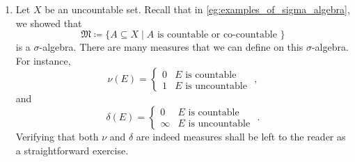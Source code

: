 \documentclass[notoc,notitlepage]{tufte-book}
\begin{document}
\begin{eg}
\begin{enumerate}
    \item Let $X$ be an uncountable set.
      Recall that in \cref{eg:examples_of_sigma_algebra},
      we showed that
      \begin{equation*}
        \mathfrak{M} \coloneqq \{ A \subseteq X
          \mid A \text{ is countable or co-countable } \}
      \end{equation*}
      is a $\sigma$-algebra.
      There are many measures that we can define on this $\sigma$-algebra.
      For instance,
      \begin{equation*}
        \nu(E) = \begin{cases}
          0 & E \text{ is countable } \\
          1 & E \text{ is uncountable }
        \end{cases},
      \end{equation*}
      and
      \begin{equation*}
        \delta(E) = \begin{cases}
          0 & E \text{ is countable } \\
          \infty & E \text{ is uncountable }
        \end{cases}.
      \end{equation*}
      Verifying that both $\nu$ and $\delta$ are indeed
      measures shall be left to the reader as
      a straightforward exercise.


\end{enumerate}
\end{eg}
\end{document}
